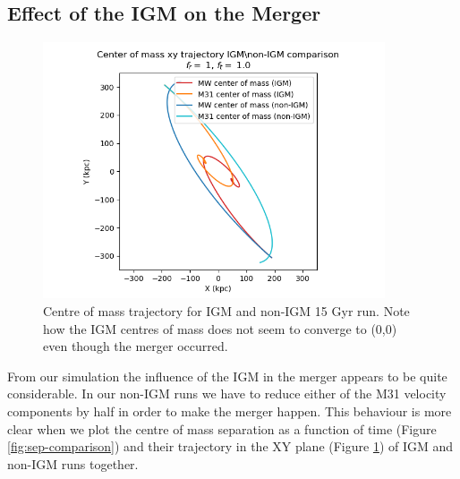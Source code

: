 \documentclass[a4paper,12pt, english]{article}
\begin{document}
\subsection{Effect of the IGM on the Merger}
\label{igm-effect}
\begin{figure}[!htb]
    \centering
    \includegraphics[width=0.9\textwidth]{_com_trajectory_IGM_comparison_tvel10.png}
    \caption{Centre of mass trajectory for IGM and non-IGM 15 Gyr run. Note how the IGM centres of mass does not seem to converge to (0,0) even though the merger occurred.}
    \label{fig:traject-comparison}
\end{figure}\par

From our simulation the influence of the IGM in the merger appears to be quite considerable. In our non-IGM runs we have to reduce either of the M31 velocity components by half in order to make the merger happen. This behaviour is more clear when we plot the centre of mass separation as a function of time (Figure \ref{fig:sep-comparison}) and their trajectory in the XY plane (Figure \ref{fig:traject-comparison}) of IGM and non-IGM runs together.\par
\newpage
\end{document}
